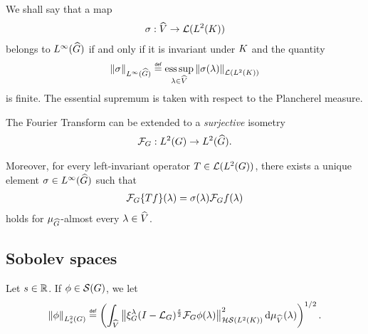 \begin{definition}
    We shall say that a map
    \begin{align*}
        \sigma : {\widehat{V}} \to {\mathcal{L} ({L^{2} (K)})}
    \end{align*}
    belongs to ${L^{\infty}_{} ({\widehat{G}})}$ if and only if it is invariant under $K$ and the quantity
    \begin{align*}
        \norm[\LebesgueDual{\infty}{\Group}]{\sigma} \defeq
            \esssup_{\lambda \in \dualGroup{\VectorSpace}}
                \norm[\Lin{\Lebesgue{2}{\CompactGroup}}]{\sigma(\lambda)}
    \end{align*}
    is finite.
    The essential supremum is taken with respect to the Plancherel measure.
\end{definition}

\begin{theorem}
    The Fourier Transform can be extended to a \emph{surjective} isometry
    \begin{align*}
        \mathcal{F}_{G} : {L^{2} (G)} \to {L^{2}_{} ({\widehat{G}})}.
    \end{align*}

    Moreover, for every left-invariant operator $T \in {\mathcal{L} ({L^{2} (G)})}$,
    there exists a unique element $\sigma \in {L^{\infty}_{} ({\widehat{G}})}$ such that
    \begin{align*}
        \mathcal{F}_{G}\{T f\}(\lambda) = \sigma(\lambda) \mathcal{F}_{G} f(\lambda)
    \end{align*}
    holds for $\mu_{{\widehat{G}}}$-almost every $\lambda \in {\widehat{V}}$.
\end{theorem}

\subsection{Sobolev spaces}

\begin{definition}
    Let $s \in \mathbb{R}$.
    If $\phi \in {\mathcal{S} (G)}$, we let
    \begin{align*}
        \norm[\Sobolev{s}]{\phi} \defeq
        \left(
            \int_\dualGroup\VectorSpace
                \norm[\HilbertSchmidt{\Lebesgue{2}{\CompactGroup}}]{%
                    \Rep\lambda \BesselPotential{s}
                    \Fourier \phi(\lambda)
                    }^2
            \dd \Plancherel\VectorSpace(\lambda)
        \right)^{1 / 2}.
    \end{align*}
\end{definition}


